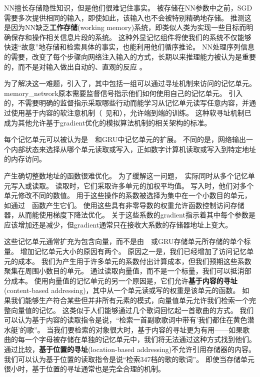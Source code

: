 \gls{NN}擅长存储隐性知识，但是他们很难记住事实。
被存储在\gls{NN}参数中之前，\gls{SGD}需要多次提供相同的输入，即使如此，该输入也不会被特别精确地存储。
\citet{Graves-et-al-2014a}推测这是因为\gls{NN}缺乏\textbf{工作存储}(working memory)系统，即类似人类为实现一些目标而明确保存和操作相关信息片段的系统。
这种外显记忆组件将使我们的系统不仅能够快速``故意''地存储和检索具体的事实，也能利用他们循序推论。
\gls{NN}处理序列信息的需要，改变了每个步骤向网络注入输入的方式，长期以来推理能力被认为是重要的，而不是对输入做出自动的、直观的反应\citep{Hinton-1990} 。


为了解决这一难题，\citet{Weston-et-al-2014}引入了，其中包括一组可以通过寻址机制来访问的记忆单元。
\gls{memory_network}原本需要监督信号指示他们如何使用自己的记忆单元。
\citet{Graves-et-al-2014a}引入的，不需要明确的监督指示采取哪些行动而能学习从记忆单元读写任意内容，并通过使用基于内容的软注意机制（~见\citet{Bahdanau-et-al-2015}和），允许端到端的训练。
这种软寻址机制已成为其他允许基于\gls{gradient}优化的模拟算法机制的相关架构的标准\citep{Sukhbaatar-et-al-2015,Joulin-Mikolov-2015,Kumar-et-al-2015,Vinyals-et-al-2015a,Grefenstette-et-al-2015}。

每个记忆单元可以被认为是~~和GRU中记忆单元的扩展。
不同的是，网络输出一个内部状态来选择从哪个单元读取或写入，正如数字计算机读取或写入到特定地址的内存访问。


产生确切整数地址的函数很难优化。
为了缓解这一问题，~实际同时从多个记忆单元写入或读取。
读取时，它们采取许多单元的加权平均值。
写入时，他们对多个单元修改不同的数值。
用于这些操作的系数被选择为集中在一个小数目的单元，如通过~~函数产生它们。
使用这些具有非零导数的权重允许函数控制访问存储器，从而能使用梯度下降法优化。
关于这些系数的\gls{gradient}指示着其中每个参数是应该增加还是减少，但\gls{gradient}通常只在接收大系数的存储器地址上变大。

这些记忆单元通常扩充为包含向量，而不是由~~或GRU存储单元所存储的单个标量。
增加记忆单元大小的原因有两个。
原因之一是，我们已经增加了访问记忆单元的成本。
我们为产生用于许多单元的系数付出计算成本，但我们预期这些系数聚集在周围小数目的单元。
通过读取向量值，而不是一个标量，我们可以抵消部分成本。 
使用向量值的记忆单元的另一个原因是，它们允许\textbf{基于内容的寻址}(content-based addressing)，其中从一个单元读或写的权重是该单元的函数。
如果我们能够生产符合某些但并非所有元素的模式，向量值单元允许我们检索一个完整向量值的记忆。
这类似于人们能够通过几个歌词回忆起一首歌曲的方式。
我们可以认为基于内容的读取指令是说，``检索一首副歌歌词中带有'我们都住在黄色潜水艇'的歌''。
当我们要检索的对象很大时，基于内容的寻址更为有用——如果歌曲的每一个字母被存储在单独的记忆单元中，我们将无法通过这种方式找到他们。
通过比较，\textbf{基于位置的寻址}(location-based addressing)不允许引用存储器的内容。
我们可以认为基于位置的读取指令是说``检索347档的歌的歌词''。
即使当存储单元很小时，基于位置的寻址通常也是完全合理的机制。

